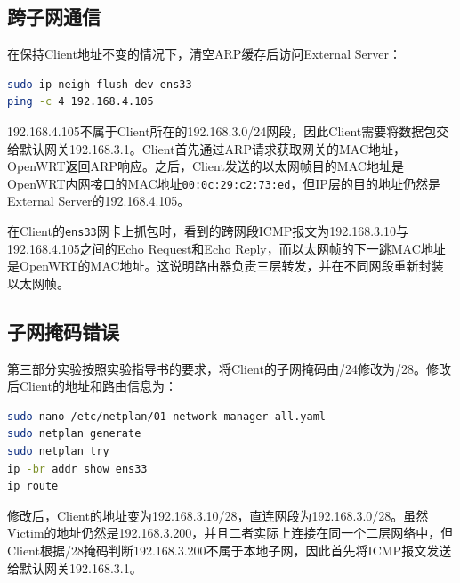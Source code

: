 
\subsection{跨子网通信}

在保持Client地址不变的情况下，清空ARP缓存后访问External Server：
\begin{lstlisting}[language=bash,caption={跨子网通信测试}]
sudo ip neigh flush dev ens33
ping -c 4 192.168.4.105
\end{lstlisting}

192.168.4.105不属于Client所在的192.168.3.0/24网段，因此Client需要将数据包交给默认网关192.168.3.1。Client首先通过ARP请求获取网关的MAC地址，OpenWRT返回ARP响应。之后，Client发送的以太网帧目的MAC地址是OpenWRT内网接口的MAC地址\texttt{00:0c:29:c2:73:ed}，但IP层的目的地址仍然是External Server的192.168.4.105。

在Client的\texttt{ens33}网卡上抓包时，看到的跨网段ICMP报文为192.168.3.10与192.168.4.105之间的Echo Request和Echo Reply，而以太网帧的下一跳MAC地址是OpenWRT的MAC地址。这说明路由器负责三层转发，并在不同网段重新封装以太网帧。


\subsection{子网掩码错误}

第三部分实验按照实验指导书的要求，将Client的子网掩码由/24修改为/28。修改后Client的地址和路由信息为：
\begin{lstlisting}[language=bash,caption={修改Client子网掩码并验证}]
sudo nano /etc/netplan/01-network-manager-all.yaml
sudo netplan generate
sudo netplan try
ip -br addr show ens33
ip route
\end{lstlisting}

修改后，Client的地址变为192.168.3.10/28，直连网段为192.168.3.0/28。虽然Victim的地址仍然是192.168.3.200，并且二者实际上连接在同一个二层网络中，但Client根据/28掩码判断192.168.3.200不属于本地子网，因此首先将ICMP报文发送给默认网关192.168.3.1。

